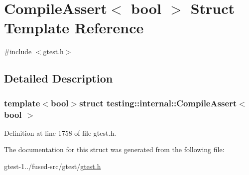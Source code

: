 \hypertarget{structtesting_1_1internal_1_1CompileAssert}{\section{\-Compile\-Assert$<$ bool $>$ \-Struct \-Template \-Reference}
\label{d3/dca/structtesting_1_1internal_1_1CompileAssert}
}


{\ttfamily \#include $<$gtest.\-h$>$}



\subsection{\-Detailed \-Description}
\subsubsection*{template$<$bool$>$struct testing\-::internal\-::\-Compile\-Assert$<$ bool $>$}



\-Definition at line 1758 of file gtest.\-h.



\-The documentation for this struct was generated from the following file\-:\begin{DoxyCompactItemize}
\item 
gtest-\/1../fused-\/src/gtest/\hyperlink{fused-src_2gtest_2gtest_8h}{gtest.\-h}\end{DoxyCompactItemize}
